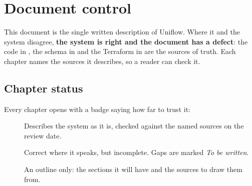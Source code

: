 \chapter*{Document control}

This document is the single written description of Uniflow. Where it and the system disagree,
\textbf{the system is right and the document has a defect}: the code in , the schema in
 and the Terraform in  are the sources of truth. Each
chapter names the sources it describes, so a reader can check it.

\section*{Chapter status}
Every chapter opens with a badge saying how far to trust it:

\begin{description}
  \item[] Describes the system as it is, checked against the named sources on the review date.
  \item[] Correct where it speaks, but incomplete. Gaps are marked \emph{To be written}.
  \item[] An outline only: the sections it will have and the sources to draw them from.
\end{description}

